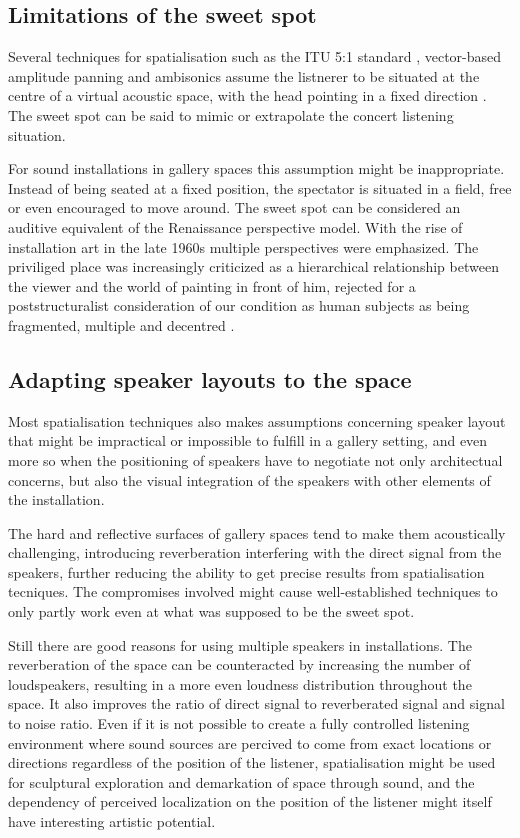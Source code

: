 \documentclass{article}
\begin{document}
\subsection{Limitations of the sweet spot}

Several techniques for spatialisation such as the ITU 5:1 standard \cite{ITU:1993_surround_5:1}, vector-based amplitude panning \cite{Pulkki:1997vbap} and ambisonics \cite{Gerzon:1985ambi_broadcast,Gerzon:1992metatheory} assume the listnerer to be situated at the centre of a virtual acoustic space, with the head pointing in a fixed direction \cite{Wishart:1996sonic_art}. The sweet spot can be said to mimic or extrapolate the concert listening situation.

For sound installations in gallery spaces this assumption might be inappropriate. Instead of being seated at a fixed position, the spectator is situated in a field, free or even encouraged to move around. The sweet spot can be considered an auditive equivalent of the Renaissance perspective model. With the rise of installation art in the late 1960s multiple perspectives were emphasized. The priviliged place was increasingly criticized as a hierarchical relationship between the viewer and the world of painting in front of him, rejected for a poststructuralist consideration of our condition as human subjects as being fragmented, multiple and decentred \cite{Bishop:2005installation}.


\subsection{Adapting speaker layouts to the space}

Most spatialisation techniques also makes assumptions concerning speaker layout that might be impractical or impossible to fulfill in a gallery setting, and even more so when the positioning of speakers have to negotiate not only architectual concerns, but also the visual integration of the speakers with other elements of the installation.

The hard and reflective surfaces of gallery spaces tend to make them acoustically challenging, introducing reverberation interfering with the direct signal from the speakers, further reducing the ability to get precise results from spatialisation tecniques. The compromises involved might cause well-established techniques to only partly work even at what was supposed to be the sweet spot.

Still there are good reasons for using multiple speakers in installations. The reverberation of the space can be counteracted by increasing the number of loudspeakers, resulting in a more even loudness distribution throughout the space. It also improves the ratio of direct signal to reverberated signal and signal to noise ratio. Even if it is not possible to create a fully controlled listening environment where sound sources are percived to come from exact locations or directions regardless of the position of the listener, spatialisation might be used for sculptural exploration and demarkation of space through sound, and the dependency of perceived localization on the position of the listener might itself have interesting artistic potential.
\end{document}
